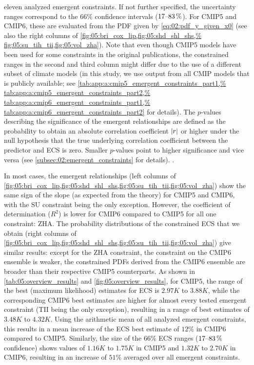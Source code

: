 \begin{table}[!b]
{    eleven analyzed emergent constraints. If not further specified, the
    uncertainty ranges correspond to the $66 \unit{\%}$ confidence intervals
    ($\rangeunit{17}{83}{\%}$). For \acs{CMIP}5 and \acs{CMIP}6, these are
    evaluated from the \acl{PDF} given by \cref{eq:02:pdf_y_given_x0} (see also
    the right columns of \cref{fig:05:bri_cox_lip,fig:05:shd_shl_shs,%
      fig:05:su_tih_tii,fig:05:vol_zha}). Note that even though \acs{CMIP}5
    models have been used for some constraints in the original publications,
    the constrained ranges in the second and third column might differ due to
    the use of a different subset of climate models (in this study, we use
    output from all \acs{CMIP} models that is publicly available; see
    \cref{tab:app:a:cmip5_emergent_constraints_part1,%
      tab:app:a:cmip5_emergent_constraints_part2,%
      tab:app:a:cmip6_emergent_constraints_part1,%
      tab:app:a:cmip6_emergent_constraints_part2} for details). The $p$-values
    describing the significance of the emergent relationships are defined as
    the probability to obtain an absolute correlation coefficient $\abs*{r}$
    or higher under the null hypothesis that the true underlying correlation
    coefficient between the predictor and \acs{ECS} is zero. Smaller
    $p$-values point to higher significance and vice versa (see
    \cref{subsec:02:emergent_constraints} for details).
    .}
  \label{tab:05:overview_results}
\end{table}

In most cases, the emergent relationships (left columns of
\cref{fig:05:bri_cox_lip,fig:05:shd_shl_shs,fig:05:su_tih_tii,fig:05:vol_zha})
show the same sign of the slope (as expected from the theory) for \acs{CMIP}5
and \acs{CMIP}6, with the SU constraint being the only exception. However, the
coefficient of determination ($R^2$) is lower for \acs{CMIP}6 compared to
\acs{CMIP}5 for all one constraint: ZHA. The probability distributions of the
constrained \ac{ECS} that we obtain (right columns of
\cref{fig:05:bri_cox_lip,fig:05:shd_shl_shs,fig:05:su_tih_tii,fig:05:vol_zha})
give similar results: except for the ZHA constraint, the constraint on the
\acs{CMIP}6 ensemble is weaker, \ie{} the constrained \acp{PDF} derived from
the \acs{CMIP}6 ensemble are broader than their respective \acs{CMIP}5
counterparts. As shown in \cref{tab:05:overview_results} and
\cref{fig:05:overview_results}, for \acs{CMIP}5, the range of the best (maximum
likelihood) estimates for \acs{ECS} is $2.97 \unit{K}$ to $3.88 \unit{K}$,
while the corresponding \acs{CMIP}6 best estimates are higher for almost every
tested emergent constraint (TII being the only exception), resulting in a range
of best estimates of $3.48 \unit{K}$ to $4.32 \unit{K}$. Using the arithmetic
mean of all analyzed emergent constraints, this results in a mean increase of
the \ac{ECS} best estimate of $12 \unit{\%}$ in \acs{CMIP}6 compared to
\acs{CMIP}5. Similarly, the size of the $66 \unit{\%}$ \ac{ECS} ranges
($\rangeunit{17}{83}{\%}$ confidence) shows values of $1.16 \unit{K}$ to $1.75
\unit{K}$ in \acs{CMIP}5 and $1.32 \unit{K}$ to $2.70 \unit{K}$ in \acs{CMIP}6,
resulting in an increase of $51 \unit{\%}$ averaged over all emergent
constraints.

